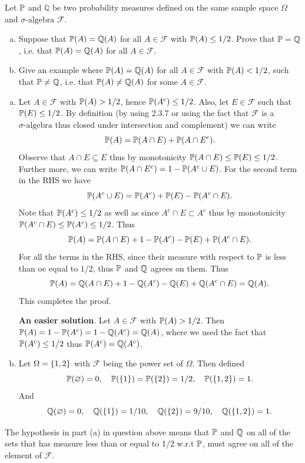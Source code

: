 \begin{problem}
	Let $ \mathbb{P} $ and $ \mathbb{Q} $ be two probability measures defined on the same sample space $ \Omega $ and $\sigma\text{-algebra}$ $ \mathcal{F} $. 
	\begin{enumerate}[(a)]
		\item Suppose that $ \mathbb{P}(A) = \mathbb{Q}(A) $ for all $ A \in \mathcal{F} $ with $ \mathbb{P}(A) \leq 1/2 $. Prove that $ \mathbb{P} = \mathbb{Q} $, i.e. that $ \mathbb{P}(A) = \mathbb{Q}(A) $ for all $ A \in \mathcal{F} $.
		\item Give an example where $ \mathbb{P}(A) = \mathbb{Q}(A) $ for all $ A \in \mathcal{F} $ with $ \mathbb{P}(A)<1/2 $, such that $ \mathbb{P} \neq \mathbb{Q} $, i.e. that $ \mathbb{P}(A) \neq \mathbb{Q}(A) $ for some $ A \in \mathcal{F} $.
	\end{enumerate}
\end{problem}
\begin{solution}
	\begin{enumerate}[(a)]
		\item Let $ A \in \mathcal{F} $ with $ \mathbb{P}(A) > 1/2 $, hence $ \mathbb{P}(A^c) \leq 1/2 $. Also, let $ E \in\mathcal{F} $ such that $ \mathbb{P}(E)\leq 1/2 $. By definition (by using 2.3.7 or using the fact that $ \mathcal{F} $ is a $\sigma\text{-algebra}$ thus closed under intersection and complement) we can write
		\[ \mathbb{P}(A) = \mathbb{P}(A \cap E) + \mathbb{P}(A\cap E^c). \]
		Observe that $ A\cap E \subseteq E $ thus by monotonicity $ \mathbb{P}(A\cap E) \leq \mathbb{P}(E) \leq 1/2 $. Further more, we can write $ \mathbb{P}(A\cap E^c) = 1 - \mathbb{P}(A^c \cup E) $. For the second term in the RHS we have
		\[ \mathbb{P}(A^c \cup E) = \mathbb{P}(A^c) + \mathbb{P}(E) - \mathbb{P}(A^c\cap E). \]
		Note that $ \mathbb{P}(A^c)\leq 1/2 $ as well as since $ A^c\cap E \subset A^c $ thus by monotonicity $ \mathbb{P}(A^c\cap E) \leq \mathbb{P}(A^c) \leq 1/2 $. Thus
		\[ \mathbb{P}(A) = \mathbb{P}(A\cap E) + 1 - \mathbb{P}(A^c) - \mathbb{P}(E) + \mathbb{P}(A^c\cap E). \]
		For all the terms in the RHS, since their measure with respect to $ \mathbb{P} $ is less than oe equal to $ 1/2 $, thus $ \mathbb{P} $ and $ \mathbb{Q} $ agrees on them. Thus 
		\[ \mathbb{P}(A) = \mathbb{Q}(A\cap E) + 1 - \mathbb{Q}(A^c) - \mathbb{Q}(E) + \mathbb{Q}(A^c\cap E) = \mathbb{Q}(A). \]
		This completes the proof.
		
		\noindent \textbf{An easier solution}. Let $ A \in \mathcal{F} $ with $ \mathbb{P}(A) > 1/2 $. Then $ \mathbb{P}(A) = 1 - \mathbb{P}(A^c) = 1 - \mathbb{Q}(A^c) = \mathbb{Q}(A) $, where we used the fact that $ \mathbb{P}(A^c)\leq 1/2 $ thus $ \mathbb{P}(A^c) = \mathbb{Q}(A^c) $.
		
		\item Let $ \Omega =  \{1,2\} $ with $ \mathcal{F} $ being the power set of $ \Omega $. Then defined
		\[ \mathbb{P}(\varnothing) = 0, \quad \mathbb{P}(\{1\}) = \mathbb{P}(\{2\}) = 1/2, \quad \mathbb{P}(\{1,2\}) = 1. \]
		And
		\[ \mathbb{Q}(\varnothing) = 0, \quad \mathbb{Q}(\{1\}) = 1/10, \quad \mathbb{Q}(\{2\})=9/10, \quad \mathbb{Q}(\{1,2\}) = 1. \]
	\end{enumerate}
\end{solution}
\begin{remark}
	The hypothesis in part (a) in question above means that $ \mathbb{P} $ and $ \mathbb{Q} $ on all of the sets that has measure less than or equal to 1/2 w.r.t $ \mathbb{P} $, must agree on all of the element of $ \mathcal{F} $.
\end{remark}

